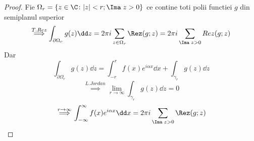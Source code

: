 \begin{tip}
\begin{proof}
        Fie $\Omega_r = \{z \in \C \colon |z|<r ; \Ima\; z>0\}$ ce contine toti polii functiei
        $g$ din semiplanul superior
        \[
            \overset{T.Rez}{\implies} \int_{\partial \Omega_r} g(z) \dd z
                = 2 \pi i \sum_{z \in \Omega_r} \Rez(g;z)
                = 2 \pi i \sum_{\Ima\; z > 0} Rez(g;z)
        \]
        Dar
        \[
            \int_{\partial \Omega_r} g(z) \dd z
                = \int_{-r}^{r} f(x)e^{i \alpha x} \dd x
                + \int_{\gamma_r} g(z) \dd z
        \]
        \[
            \overset{L.Jordan}{\implies} \lim_{r \to \infty} \int_{\gamma_r} g(z) \dd z = 0
        \]
        \[
            \overset{r\to\infty}{\implies} \int_{-\infty}^{\infty} f(x)e^{i \alpha x} \dd x
                = 2 \pi i \sum_{\Ima\; z > 0} \Rez(g;z)
        \]
    \end{proof}

\end{tip}